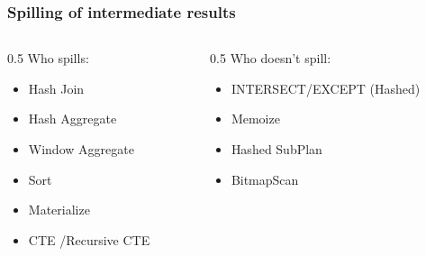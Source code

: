 \documentclass{beamer}
\begin{document}

\begin{frame}\frametitle{Spilling of intermediate results}
  \vspace*{\fill}
  \begin{columns}[T,onlytextwidth]
    \begin{column}{0.5\textwidth}
      {\large\color{ptoink}Who spills:}\medskip
      {\small\color{ptoink}
        \begin{itemize}\itemsep4pt
          \item Hash Join
          \item Hash Aggregate
          \item Window Aggregate
          \item Sort
          \item Materialize
          \item CTE /Recursive CTE
        \end{itemize}
      }
  \end{column}
    
    \begin{column}{0.5\textwidth}
       {\large\color{ptoink}Who doesn't spill:}\medskip
      {\small\color{ptoink}
        \begin{itemize}\itemsep4pt
          \item INTERSECT/EXCEPT (Hashed)
          \item Memoize
          \item Hashed SubPlan
          \item BitmapScan
        \end{itemize}
      }
    \end{column}
  \end{columns}
  \vspace*{\fill}
\end{frame}

\end{document}
